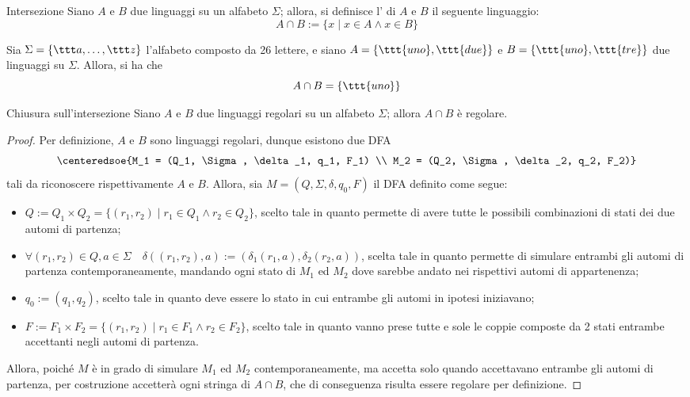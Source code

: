 \documentclass[a4paper, 12pt]{report}
\begin{document}
    \begin{frameddefn}{Intersezione}
        Siano $A$ e $B$ due linguaggi su un alfabeto $\Sigma$; allora, si definisce l' di $A$ e $B$ il seguente linguaggio: $$A \cap B := \{x \mid x \in A \land x \in B \}$$
    \end{frameddefn}

    \begin{example}[Intersezione]
        Sia $\Sigma = \{\ttt a , \ldots, \ttt z\}$ l'alfabeto composto da 26 lettere, e siano $A = \{\ttt{uno}, \ttt{due}\}$ e $B = \{\ttt{uno}, \ttt{tre}\}$ due linguaggi su $\Sigma$. Allora, si ha che $$A \cap B = \{\ttt{uno}\}$$
    \end{example}

    \begin{framedprop}{Chiusura sull'intersezione}
        Siano $A$ e $B$ due linguaggi regolari su un alfabeto $\Sigma$; allora $A \cap B$ è regolare.
    \end{framedprop}

    \begin{proof}
        Per definizione, $A$ e $B$ sono linguaggi regolari, dunque esistono due DFA $$\centeredsoe{M_1 = (Q_1, \Sigma, \delta_1, q_1, F_1) \\ M_2 = (Q_2, \Sigma, \delta_2, q_2, F_2)}$$ tali da riconoscere rispettivamente $A$ e $B$. Allora, sia $M = (Q, \Sigma, \delta, q_0, F)$ il DFA definito come segue:

        \begin{itemize}
            \item $Q := Q_1 \times Q_2 = \{(r_1, r_2) \mid r_1 \in Q_1 \land r_2 \in Q_2\}$, scelto tale in quanto permette di avere tutte le possibili combinazioni di stati dei due automi di partenza;
            \item $\forall (r_1, r_2) \in Q, a \in \Sigma \quad \delta((r_1, r_2), a) := (\delta_1(r_1, a), \delta_2(r_2, a))$, scelta tale in quanto permette di simulare entrambi gli automi di partenza contemporaneamente, mandando ogni stato di $M_1$ ed $M_2$ dove sarebbe andato nei rispettivi automi di appartenenza;
            \item $q_0 := (q_1, q_2)$, scelto tale in quanto deve essere lo stato in cui entrambe gli automi in ipotesi iniziavano;
            \item $F:= F_1 \times F_2 = \{(r_1, r_2) \mid r_1 \in F_1 \land r_2 \in F_2\}$, scelto tale in quanto vanno prese tutte e sole le coppie composte da 2 stati entrambe accettanti negli automi di partenza.
        \end{itemize}

        Allora, poiché $M$ è in grado di simulare $M_1$ ed $M_2$ contemporaneamente, ma accetta solo quando accettavano entrambe gli automi di partenza, per costruzione accetterà ogni stringa di $A \cap B$, che di conseguenza risulta essere regolare per definizione.
    \end{proof}
\end{document}
